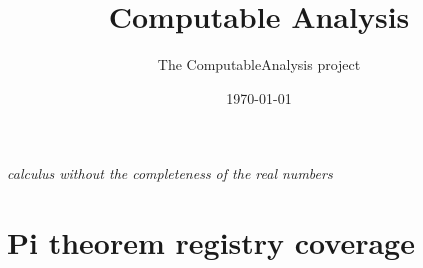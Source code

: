 \documentclass[11pt]{report}
\title{Computable Analysis}
\author{The ComputableAnalysis project}
\date{\today}
\begin{document}
\maketitle
\begin{center}
{\large\itshape calculus without the completeness of the real numbers}
\end{center}

\section*{Pi theorem registry coverage}
\label{sec:front-pi-scoreboard}


\tableofcontents


\end{document}
